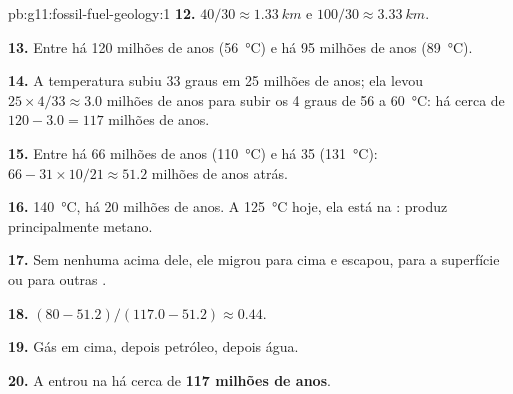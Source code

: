 \begin{solution}{pb:g11:fossil-fuel-geology:1}
\textbf{12.} $40/30 \approx \qty{1.33}{km}$ e $100/30 \approx
\qty{3.33}{km}$.

\textbf{13.} Entre há 120 milhões de anos (\qty{56}{\degreeCelsius}) e há
95 milhões de anos (\qty{89}{\degreeCelsius}).

\textbf{14.} A temperatura subiu 33 graus em 25 milhões de anos; ela levou
$25 \times 4/33 \approx 3.0$ milhões de anos para subir os 4 graus de
\num{56} a \qty{60}{\degreeCelsius}: há cerca de $120 - 3.0 = 117$ milhões
de anos.

\textbf{15.} Entre há 66 milhões de anos (\qty{110}{\degreeCelsius}) e há
35 (\qty{131}{\degreeCelsius}): $66 - 31 \times 10/21 \approx 51.2$ milhões
de anos atrás.

\textbf{16.} \qty{140}{\degreeCelsius}, há 20 milhões de anos. A
\qty{125}{\degreeCelsius} hoje, ela está na : produz
principalmente metano.

\textbf{17.} Sem nenhuma  acima dele, ele migrou para cima e
escapou, para a superfície ou para outras .

\textbf{18.} $(80 - 51.2)/(117.0 - 51.2) \approx 0.44$.

\textbf{19.} Gás em cima, depois petróleo, depois água.

\textbf{20.} A  entrou na  há cerca de
\textbf{117 milhões de anos}.
\end{solution}
